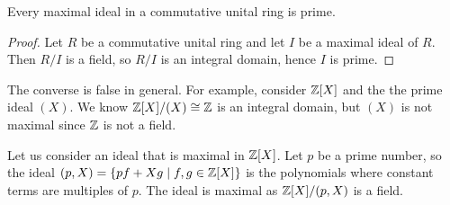 \begin{corollary}
  Every maximal ideal in a commutative unital ring is prime.
  \label{cor:maximalPrime}
\end{corollary}
\begin{proof}
  Let $R$ be a commutative unital ring and let $I$ be a maximal ideal of $R$. Then $R/I$ is a field, so $R/I$ is an integral
  domain, hence $I$ is prime.
\end{proof}

\begin{remark}
  The converse is false in general. For example, consider $\mathbb Z[X]$ and the the prime ideal $(X)$. We know $\mathbb Z[X]/(X)\cong \mathbb Z$ is an integral domain, but $(X)$ is not maximal since $\mathbb Z$ is not a field. 
\end{remark}
\begin{example}
    Let us consider an ideal that is maximal in $\mathbb Z[X]$. Let
  $p$ be a prime number, so the ideal $(p,X)=\{pf+Xg \mid f,g\in\mathbb Z[X]\}$ is the polynomials
  where constant terms are multiples of $p$. The ideal is maximal as $\mathbb Z[X]/(p,X)$ is a field.
\end{example}
